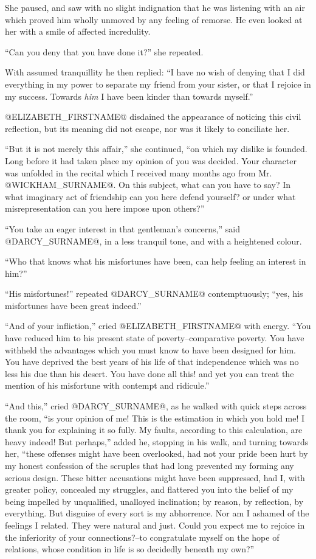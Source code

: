 She paused, and saw with no slight indignation that he was listening
with an air which proved him wholly unmoved by any feeling of remorse.
He even looked at her with a smile of affected incredulity.

``Can you deny that you have done it?'' she repeated.

With assumed tranquillity he then replied: ``I have no wish of denying
that I did everything in my power to separate my friend from your
sister, or that I rejoice in my success. Towards \textit{him} I have been
kinder than towards myself.''

@ELIZABETH_FIRSTNAME@ disdained the appearance of noticing this civil reflection,
but its meaning did not escape, nor was it likely to conciliate her.

``But it is not merely this affair,'' she continued, ``on which my dislike
is founded. Long before it had taken place my opinion of you was
decided. Your character was unfolded in the recital which I received
many months ago from Mr. @WICKHAM_SURNAME@. On this subject, what can you have to
say? In what imaginary act of friendship can you here defend yourself?
or under what misrepresentation can you here impose upon others?''

``You take an eager interest in that gentleman's concerns,'' said @DARCY_SURNAME@,
in a less tranquil tone, and with a heightened colour.

``Who that knows what his misfortunes have been, can help feeling an
interest in him?''

``His misfortunes!'' repeated @DARCY_SURNAME@ contemptuously; ``yes, his misfortunes
have been great indeed.''

``And of your infliction,'' cried @ELIZABETH_FIRSTNAME@ with energy. ``You have reduced
him to his present state of poverty--comparative poverty. You have
withheld the advantages which you must know to have been designed for
him. You have deprived the best years of his life of that independence
which was no less his due than his desert. You have done all this!
and yet you can treat the mention of his misfortune with contempt and
ridicule.''

``And this,'' cried @DARCY_SURNAME@, as he walked with quick steps across the room,
``is your opinion of me! This is the estimation in which you hold me!
I thank you for explaining it so fully. My faults, according to this
calculation, are heavy indeed! But perhaps,'' added he, stopping in
his walk, and turning towards her, ``these offenses might have been
overlooked, had not your pride been hurt by my honest confession of the
scruples that had long prevented my forming any serious design. These
bitter accusations might have been suppressed, had I, with greater
policy, concealed my struggles, and flattered you into the belief of
my being impelled by unqualified, unalloyed inclination; by reason, by
reflection, by everything. But disguise of every sort is my abhorrence.
Nor am I ashamed of the feelings I related. They were natural and
just. Could you expect me to rejoice in the inferiority of your
connections?--to congratulate myself on the hope of relations, whose
condition in life is so decidedly beneath my own?''

